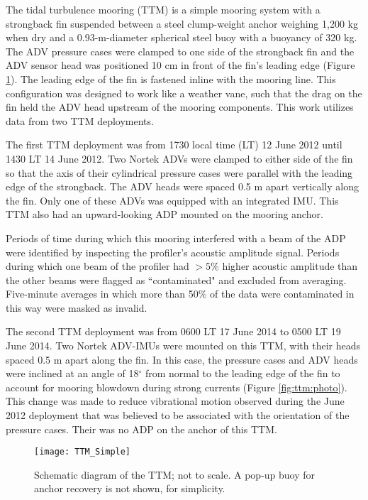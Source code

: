 The tidal turbulence mooring (TTM) is a simple mooring system with a strongback fin suspended between a steel clump-weight anchor weighing 1,200 kg when dry and a 0.93-m-diameter spherical steel buoy with a buoyancy of 320 kg. The ADV pressure cases were clamped to one side of the strongback fin and the ADV sensor head was positioned 10 cm in front of the fin's leading edge (Figure \ref{fig:ttm:diagram}). The leading edge of the fin is fastened inline with the mooring line. This configuration was designed to work like a weather vane, such that the drag on the fin held the ADV head upstream of the mooring components.  This work utilizes data from two TTM deployments. 

The first TTM deployment was from 1730 local time (LT) 12 June 2012 until 1430 LT 14 June 2012. Two Nortek ADVs were clamped to either side of the fin so that the axis of their cylindrical pressure cases were parallel with the leading edge of the strongback. The ADV heads were spaced 0.5 m apart vertically along the fin. Only one of these ADVs was equipped with an integrated IMU. This TTM also had an upward-looking ADP mounted on the mooring anchor.

Periods of time during which this mooring interfered with a beam of the ADP were identified by inspecting the profiler's acoustic amplitude signal. Periods during which one beam of the profiler had $>5\%$ higher acoustic amplitude than the other beams were flagged as ``contaminated" and excluded from averaging.  Five-minute averages in which more than 50\% of the data were contaminated in this way were masked as invalid.

The second TTM deployment was from 0600 LT 17 June 2014 to 0500 LT 19 June 2014.  Two Nortek ADV-IMUs were mounted on this TTM, with their heads spaced 0.5 m apart along the fin. In this case, the pressure cases and ADV heads were inclined at an angle of 18$^\circ$ from normal to the leading edge of the fin to account for mooring blowdown during strong currents (Figure \ref{fig:ttm:photo}). This change was made to reduce vibrational motion observed during the June 2012 deployment that was believed to be associated with the orientation of the pressure cases. Their was no ADP on the anchor of this TTM.

\begin{figure}[t]
  \centering
  \texttt{[image: TTM\_Simple]}
  \caption{Schematic diagram of the TTM; not to scale. A pop-up buoy for anchor recovery is not shown, for simplicity.}
  \label{fig:ttm:diagram}
\end{figure}

